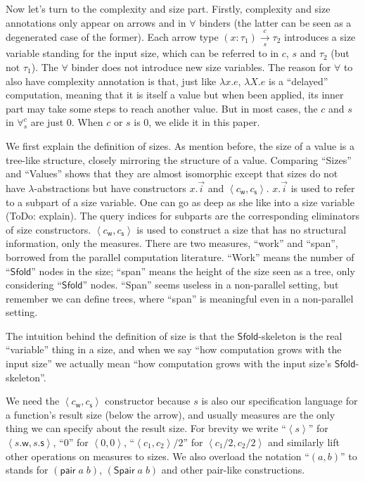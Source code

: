 \documentclass[preprint]{sigplanconf}
\newcommand{\arrow}[4]{#1\xrightarrow[#3]{#2}#4}
\newcommand{\symSfold}{\mathsf{Sfold}}
\newcommand{\sympair}{\mathsf{pair}}
\newcommand{\intro}[2]{(#1 : #2)}
\newcommand{\symSpair}{\mathsf{Spair}}
\newcommand{\symwork}{\mathsf{w}}
\newcommand{\symspan}{\mathsf{s}}
\newcommand{\Sstats}[1]{\left \langle #1 \right \rangle}
\begin{document}
Now let's turn to the complexity and size part. Firstly, complexity and size annotations only appear on arrows and in $\forall$ binders (the latter can be seen as a degenerated case of the former). Each arrow type $\arrow{\intro{x}{\tau_1}}{c}{s}{\tau_2}$ introduces a size variable standing for the input size, which can be referred to in $c$, $s$ and $\tau_2$ (but not $\tau_1$). The $\forall$ binder does not introduce new size variables. The reason for $\forall$ to also have complexity annotation is that, just like $\lambda x.e$, $\lambda X.e$ is a ``delayed'' computation, meaning that it is itself a value but when been applied, its inner part may take some steps to reach another value. But in most cases, the $c$ and $s$ in $\forall^c_s$ are just 0. When $c$ or $s$ is 0, we elide it in this paper.

We first explain the definition of sizes. As mention before, the size of a value is a tree-like structure, closely mirroring the structure of a value. Comparing ``Sizes'' and ``Values'' shows that they are almost isomorphic except that sizes do not have $\lambda$-abstractions but have constructors $x.\vec{i}$ and $\Sstats{c_\symwork,c_\symspan}$. $x.\vec{i}$ is used to refer to a subpart of a size variable. One can go as deep as she like into a size variable (ToDo: explain). The query indices for subparts are the corresponding eliminators of size constructors. $\Sstats{c_\symwork,c_\symspan}$ is used to construct a size that has no structural information, only the measures. There are two measures, ``work'' and ``span'', borrowed from the parallel computation literature. ``Work'' means the number of ``$\symSfold$'' nodes in the size; ``span'' means the height of the size seen as a tree, only considering ``$\symSfold$'' nodes. ``Span'' seems useless in a non-parallel setting, but remember we can define trees, where ``span'' is meaningful even in a non-parallel setting.

The intuition behind the definition of size is that the $\symSfold$-skeleton is the real ``variable'' thing in a size, and when we say ``how computation grows with the input size'' we actually mean ``how computation grows with the input size's $\symSfold$-skeleton''.

We need the $\Sstats{c_\symwork,c_\symspan}$ constructor because $s$ is also our specification language for a function's result size (below the arrow), and usually measures are the only thing we can specify about the result size. For brevity we write ``$\Sstats{s}$'' for $\Sstats{s.\symwork,s.\symspan}$, ``0'' for $\Sstats{0,0}$, ``$\Sstats{c_1,c_2}/2$'' for $\Sstats{c_1/2,c_2/2}$ and similarly lift other operations on measures to sizes. We also overload the notation ``$(a,b)$'' to stands for $(\sympair\;a\;b)$, $(\symSpair\;a\;b)$ and other pair-like constructions.
\end{document}
